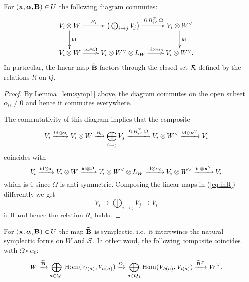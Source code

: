 \documentclass{amsart}
\newcommand{\balpha}{\boldsymbol{\alpha}}
\theoremstyle{definition}
\begin{document}
\begin{lemma}\label{lem:rela}
For $(\bfx, \balpha, \bfB) \in U$ the following diagram commutes:
\begin{equation}\label{eq:comdiag}
    \xymatrix{V_i \otimes W \ar[r]^-{B_i} \ar[d]^{\textup{id}} & \big(\bigoplus_{i \rightarrow j}  V_j\big) \ar[r]^-{\Omega\,B_{i^\vee}^T \, \Omega} & V_i \otimes W^\vee \ar[d]^{\textup{id}} \\
    V_i \otimes W \ar[r]^-{\textup{id} \otimes \Omega} & V_i \otimes W^\vee \otimes L_W \ar[r]^-{\textup{id} \otimes \alpha_0} & V_i \otimes W^\vee.}
\end{equation}
In particular, the linear map $\widetilde{\mathbf{B}}$ factors through the closed set $\mathcal{R}$ defined by the relations $R$ on $Q$.
\end{lemma}

\begin{proof}
By Lemma~\ref{lem:symp1} above, the diagram commutes on the open subset $\alpha_0 \neq 0$ and hence it commutes everywhere.

The commutativity of this diagram implies that the composite 
\begin{equation}\label{eq:inR}
    V_{i} \xrightarrow{\textup{id} \otimes \mathbf{x}} V_{i} \otimes W \xrightarrow{B_{i}} \bigoplus_{i \rightarrow j} V_j \xrightarrow{\Omega\,B_{i^\vee}^T \, \Omega} V_{i} \otimes W^\vee \xrightarrow{\textup{id} \otimes \mathbf{x}^\vee} V_i
\end{equation}
coincides with
$$V_i \xrightarrow{\textup{id} \otimes \mathbf{x}} V_i \otimes W \xrightarrow{\textup{id} \otimes \Omega} V_i \otimes W^\vee \otimes L_W \xrightarrow{\textup{id} \otimes \alpha_0} V_i \otimes W^\vee \xrightarrow {\textup{id} \otimes \mathbf{x}^\vee} V_i$$ 
which is $0$ since $\Omega$ is anti-symmetric.
Composing the linear maps in (\ref{eq:inR}) differently we get $$V_i \longrightarrow \bigoplus_{i \rightarrow j} V_j \longrightarrow V_i$$
is 0 and hence the relation $R_i$ holds.
\end{proof}

\begin{lemma}\label{lem:symp2}
For $(\bfx, \balpha, \bfB) \in U$ the map $\widetilde{\mathbf{B}}$ is symplectic, i.e.\ it intertwines the natural symplectic forms on $W$ and $\mathcal{S}$.
In other word, the following composite coincides with $\Omega \circ \alpha_0$:
\begin{equation}
    W \xrightarrow{\widetilde{\mathbf{B}}} \bigoplus_{a \in Q_1} \operatorname{Hom}(V_{t(a)}, V_{h(a)}) \xrightarrow{\Omega} \bigoplus_{a \in Q_1} \operatorname{Hom}(V_{h(a)}, V_{t(a)}) \xrightarrow{\widetilde{\mathbf{B}}^T} W^\vee.
\end{equation}
\end{lemma}
\end{document}
